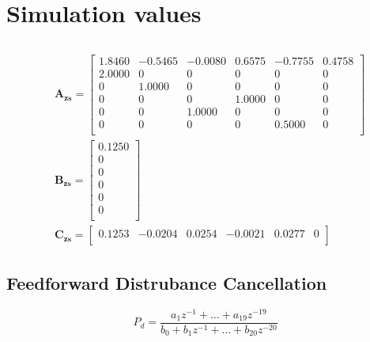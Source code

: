 \chapter{Simulation values}\label{cha:definition}

\section{\abbrRFDC}
\begin{subequations}
  \label{eq:sysmatrices}
  \begin{alignat}{2}
  & \mathbf{A_{zs}} =
    \begin{bmatrix}
  1.8460 &  -0.5465 &  -0.0080 &   0.6575 &  -0.7755 &   0.4758\\
  2.0000 &        0 &        0 &        0 &        0 &        0\\
       0 &   1.0000 &        0 &        0 &        0 &        0\\
       0 &        0 &        0 &   1.0000 &        0 &        0\\
       0 &        0 &   1.0000 &        0 &        0 &        0\\
       0 &        0 &        0 &        0 &   0.5000 &        0\\
    \end{bmatrix}\\
  & \mathbf{B_{zs}} =
  \begin{bmatrix}
    0.1250\\
         0\\
         0\\
         0\\
         0\\
         0\\
  \end{bmatrix} \\
  & \mathbf{C_{zs}} =
  \begin{bmatrix}
      0.1253  & -0.0204  &  0.0254  & -0.0021  &  0.0277     &    0\\
  \end{bmatrix}
  \end{alignat}
\end{subequations}
\newpage
\section{Feedforward Distrubance Cancellation}

\begin{equation}
  P_d = \frac{a_1z^{-1} + \hdots + a_{19}z^{-19}}{b_0 + b_1z^{-1} + \hdots + b_{20}z^{-20}}
\end{equation}

